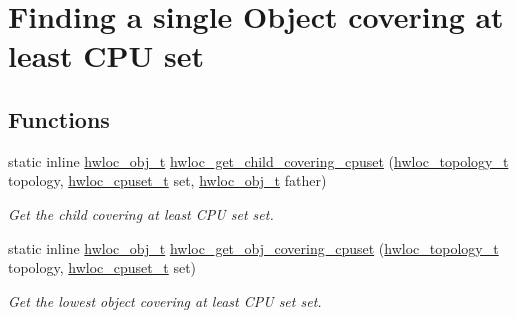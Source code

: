 \hypertarget{group__hwlocality__helper__find__covering}{
\section{Finding a single Object covering at least CPU set}
\label{group__hwlocality__helper__find__covering}
}
\subsection*{Functions}
\begin{DoxyCompactItemize}
\item 
static inline \hyperlink{structhwloc__obj}{hwloc\_\-obj\_\-t} \hyperlink{group__hwlocality__helper__find__covering_ga8f38a876af68365766fff3785bc6a201}{hwloc\_\-get\_\-child\_\-covering\_\-cpuset} (\hyperlink{group__hwlocality__topology_ga9d1e76ee15a7dee158b786c30b6a6e38}{hwloc\_\-topology\_\-t} topology, \hyperlink{group__hwlocality__cpuset_ga7366332f7090f5b54d4b25a0c2c4b411}{hwloc\_\-cpuset\_\-t} set, \hyperlink{structhwloc__obj}{hwloc\_\-obj\_\-t} father)
\begin{DoxyCompactList}\small\item\em Get the child covering at least CPU set {\ttfamily set}. \item\end{DoxyCompactList}\item 
static inline \hyperlink{structhwloc__obj}{hwloc\_\-obj\_\-t} \hyperlink{group__hwlocality__helper__find__covering_gaf495236e86281fedf1fda14f1e1a8ce4}{hwloc\_\-get\_\-obj\_\-covering\_\-cpuset} (\hyperlink{group__hwlocality__topology_ga9d1e76ee15a7dee158b786c30b6a6e38}{hwloc\_\-topology\_\-t} topology, \hyperlink{group__hwlocality__cpuset_ga7366332f7090f5b54d4b25a0c2c4b411}{hwloc\_\-cpuset\_\-t} set)
\begin{DoxyCompactList}\small\item\em Get the lowest object covering at least CPU set {\ttfamily set}. \item\end{DoxyCompactList}\end{DoxyCompactItemize}


